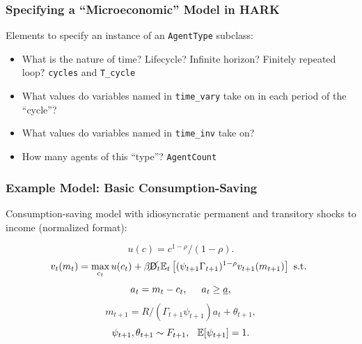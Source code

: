 \documentclass{beamer}
\newcommand{\bi}{\begin{itemize}}
\newcommand{\ei}{\end{itemize}}
\newcommand{\Ex}{\mathbb{E}}
\newcommand{\PDies}{\mathsf{D}}
\newcommand{\PLives}{\cancel{\PDies}}
\begin{document}
\begin{frame}
\frametitle{Specifying a ``Microeconomic'' Model in HARK}

\begin{block}{Elements to specify an instance of an \texttt{AgentType} subclass:}
\bi
\item What is the nature of time? Lifecycle? Infinite horizon? Finitely repeated loop? \texttt{cycles} and \texttt{T\_cycle}

\item What values do variables named in \texttt{time\_vary} take on in each period of the ``cycle''?

\item What values do variables named in \texttt{time\_inv} take on?

\item How many agents of this ``type''? \texttt{AgentCount}

\ei

\end{block}
\end{frame}


\begin{frame}
  \frametitle{Example Model: Basic Consumption-Saving}

  Consumption-saving model with idiosyncratic permanent and transitory shocks to income (normalized format):

  \begin{equation*}
    u(c) = c^{1-\rho}/(1-\rho).
  \end{equation*}
  \begin{equation*}
    v_t(m_t) = \max_{c_t} u(c_t) + \beta \PLives_t \Ex_t \left[(\psi_{t+1} \Gamma_{t+1})^{1-\rho} v_{t+1}(m_{t+1}) \right] \text{ s.t. }
  \end{equation*}
  \begin{equation*}
    a_t = m_t - c_t, \hspace{0.5cm} a_t \geq \underline{a},
  \end{equation*}
  \begin{equation*}
    m_{t+1} = R/(\Gamma_{t+1} \psi_{t+1}) a_t + \theta_{t+1}, 
  \end{equation*}
  \begin{equation*}
    \psi_{t+1},\theta_{t+1} \sim F_{t+1}, \hspace{0.25cm} \Ex[\psi_{t+1}] = 1.
  \end{equation*}

\end{frame}
\end{document}
